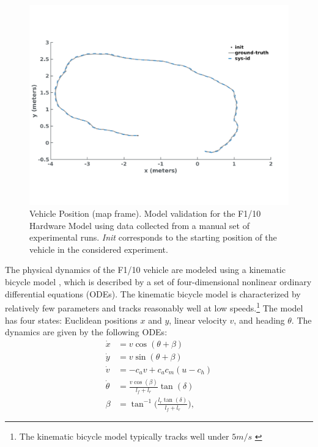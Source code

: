 \documentclass[manuscript,screen,review]{acmart}
\begin{document}
\begin{figure}[htbp]%
  \centering
    \includegraphics[width=0.70\linewidth]{figures/sys_id2_2.pdf}
  \caption{Vehicle Position (map frame). Model validation for the F1/10 Hardware Model using data collected from a manual set of experimental runs. \emph{Init} corresponds to the starting position of the vehicle in the considered experiment.}
  \label{fig:validation}
\end{figure}%


The physical dynamics of the F1/10 vehicle are modeled using a kinematic bicycle model \cite{Rajamani2012}, which is described by a set of four-dimensional nonlinear ordinary differential equations (ODEs). The kinematic bicycle model is characterized by relatively few parameters and tracks reasonably well at low speeds.\footnote{ The kinematic bicycle model typically tracks well under $5 m/s$ \cite{ivanov2020case}} The model has four states: Euclidean positions $x$ and $y$, linear velocity $v$, and heading $\theta$. The dynamics are given by the following ODEs: 
\begin{align*}
    \Dot{x} & = v\cos(\theta +\beta)\\
    \Dot{y} & = v\sin(\theta + \beta)\\
    \Dot{v} & = -c_av +c_ac_m(u-c_h)\\
    \Dot{\theta} & = \frac{v\cos(\beta)}{l_f+l_r}\tan(\delta)\\
    \beta &= \tan^{-1}\Big(\frac{l_r\tan(\delta)}{l_f+l_r}\Big),
\end{align*}
\end{document}
